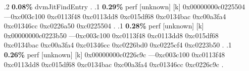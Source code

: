\begin{profile}
{.2 \textbf{0.08\%} dvmJitFindEntry\newline {} . 
.1 \textbf{ 0.29\%} perf             [unknown]              [k] 0x00000000c0225504\newline {} ---0xc003c100\newline {} 0xc0113f48\newline {} 0xc0113dd8\newline {} 0xc015df68\newline {} 0xc0134bac\newline {} 0xc00a3fa4\newline {} 0xc01346cc\newline {} 0xc0226a50\newline {} 0xc0225504\newline {} . 
.1 \textbf{ 0.28\%} perf             [unknown]              [k] 0x00000000c0223b50\newline {} ---0xc003c100\newline {} 0xc0113f48\newline {} 0xc0113dd8\newline {} 0xc015df68\newline {} 0xc0134bac\newline {} 0xc00a3fa4\newline {} 0xc01346cc\newline {} 0xc0226bd0\newline {} 0xc0225cf4\newline {} 0xc0223b50\newline {} . 
.1 \textbf{ 0.26\%} perf             [unknown]              [k] 0x00000000c0226c9c\newline {} ---0xc003c100\newline {} 0xc0113f48\newline {} 0xc0113dd8\newline {} 0xc015df68\newline {} 0xc0134bac\newline {} 0xc00a3fa4\newline {} 0xc01346cc\newline {} 0xc0226c9c\newline {} . 
}
\end{profile}
